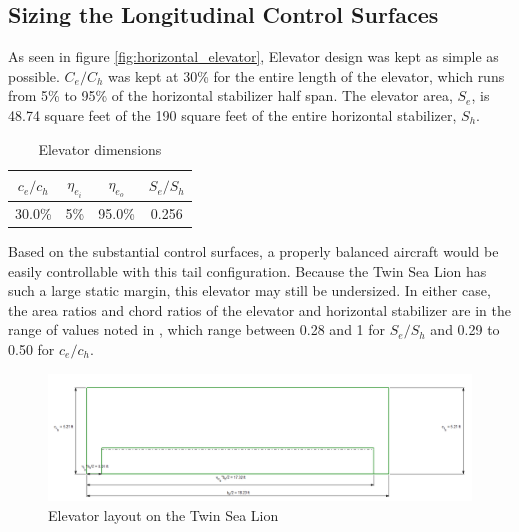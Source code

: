 \documentclass[conf]{new-aiaa}
\begin{document}
\subsection{Sizing the Longitudinal Control Surfaces}

As seen in figure \ref{fig:horizontal_elevator}, Elevator design was kept as simple as possible. $C_e/C_h$ was kept at 30\% for the entire length of the elevator, which runs from 5\% to 95\% of the horizontal stabilizer half span. The elevator area, $S_e$, is 48.74 square feet of the 190 square feet of the entire horizontal stabilizer, $S_h$.

\begin{table}[H]
\centering
\caption{Elevator dimensions}
\begin{tabular}{|c|c|c|c|}\hline
    $c_e/c_h$ & $\eta_{e_i}$ & $\eta_{e_o}$ & $S_e/S_h$ \\ \hline
    30.0\%    & 5\%          & 95.0\%       & 0.256     \\ \hline
\end{tabular}
\label{tab:elevator_size_table}
\end{table}

Based on the substantial control surfaces, a properly balanced aircraft would 
be easily controllable with this tail configuration. Because the Twin Sea Lion has 
such a large static margin, this elevator may still be undersized. In either case, 
the area ratios and chord ratios of the elevator and horizontal stabilizer are in 
the range of values noted in \cite{orange_book}, which range between 0.28 and 1 for $S_e/S_h$ and 0.29 to 0.50 for $c_e/c_h$.

\begin{figure}[H]
    \includegraphics[width=\textwidth]{Report3Printouts/Empannage/Horizontal_elevator_plot.png}
    \caption{Elevator layout on the Twin Sea Lion}
    \label{fig:horizontal_elevator_plot}
\end{figure}
\end{document}

